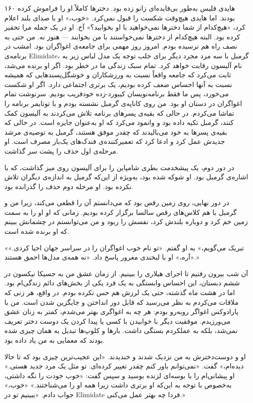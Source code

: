 ۱۶۰  
هایدی فلیس به‌طور بی‌فایده‌ای زانو زده بود. دخترها کاملاً او را فراموش کرده بودند.  
اما هایدی هیچ‌وقت شکست را قبول نمی‌کرد. «خوب،» او با صدای بلند اعلام کرد، «هیچ‌کدام از شما دخترها نمی‌خواهید با او بخوابید؟»  
آخ.  
او در یک جمله مرا تحقیر کرده بود. البته هیچ‌کدام از دخترها نمی‌خواستند با من بخوابند — هنوز نه. من حتی به نصف راه هم نرسیده بودم.  
امروز روز مهمی برای جامعه‌ی اغواگران بود. امشب در برنامه‌ی Elimidate،  
گرمبل با سه مرد مجرد دیگر برای جلب توجه یک مدل لباس زیر به نام آلیسون رقابت خواهد کرد. تمام سبک زندگی ما در خطر بود.  
اگر او برنده می‌شد، ثابت می‌کرد که جامعه واقعاً نسبت به ورزشکاران و خوشگل‌پسندهایی که همیشه نسبت به آنها احساس ضعف کرده بودیم،  
یک برتری اجتماعی دارد. اگر او شکست می‌خورد، پس ما فقط برنامه‌نویسان کیبورد-زده خودفریب بودیم. سرنوشت تمام اغواگران در دستان او بود.  
من روی کاناپه‌ی گرمبل نشسته بودم و با توتایمر برنامه را تماشا می‌کردم.  
در حالی که بقیه‌ی پسرهای برنامه تلاش می‌کردند به آلیسون کمک کنند، گرمبل تکیه داده بود و وانمود می‌کرد که او به‌عنوان جایزه است.  
در حالی که بقیه‌ی پسرها به خود می‌بالیدند که چقدر موفق هستند، گرمبل به توصیه‌ی مرشد جدیدش عمل کرد و ادعا کرد که تعمیرکننده‌ی فندک‌های یک‌بار مصرف است. او مرحله‌ی اول حذف را پشت سر گذاشت.  

در دور دوم، یک پیشخدمت بطری شامپاین را برای آلیسون روی میز گذاشت، که با اشاره‌ی گرمبل بود. او شوکه شده بود، به‌ویژه از این‌که گرمبل به اندازه‌ی دیگران تلاش نکرده بود. او مرحله دوم حذف را گذرانده بود.  

در دور نهایی، روی زمین رقص بود که می‌دانستم آن را قطعی می‌کند، زیرا من و گرمبل با هم کلاس‌های رقص سالسا برگزار کرده بودیم. زمانی که او او را به سمت زمین خم کرد و دوباره بلندش کرد، نفسش را ربود و من می‌توانستم در چشمانش ببینم که او برنده شده است.  

«تبریک می‌گویم،» به او گفتم. «تو نام خوب اغواگران را در سراسر جهان احیا کردی.»  
«آره،» او با لبخندی مغرور پاسخ داد. «نه همه‌ی مدل‌ها احمق هستند.»  

آن شب بیرون رفتیم تا اجرای هیلاری را ببینیم. از زمان عشق من به جسیکا نیکسون در ششم دبستان، این احساس وابستگی به یک فرد یکی از بخش‌های دائم زندگی‌ام بود. اما در هشت ماه گذشته، حتی یک لرزش هم حس نکرده بودم. در واقع، هر زنی که ملاقات می‌کردم به نظر می‌رسید که قابل دور انداختن و جایگزین شدن است. من با پارادوکس اغواگر روبه‌رو بودم: هر چه به اغواگری بهتر می‌شدم، کمتر به زنان عشق می‌ورزیدم. موفقیت دیگر با خوابیدن با کسی یا پیدا کردن یک دوست دختر تعریف نمی‌شد، بلکه به عملکردم بستگی داشت. بارها و کلوپ‌ها تبدیل به همان چیزی شده بودند که معمایی به من یاد داده بود.  

او و دوست‌دخترش به من نزدیک شدند و خندیدند. «این عجیب‌ترین چیزی بود که تا حالا دیده‌ام،» گفت. «نمی‌توانم باور کنم چقدر تغییر کرده‌ای. تو مثل یک مرد جدید هستی.»  
او پیشانی‌ام را با بوسه‌ای لزنده بوسید و سپس گفت: «خوب خودت را نگه داشتی، به‌خصوص با توجه به این‌که او برتری داشت زیرا همه او را می‌شناختند.»  
«خوب،» جواب دادم. «ببینیم تو در Elimidate فردا چه بهتر عمل می‌کنی.»